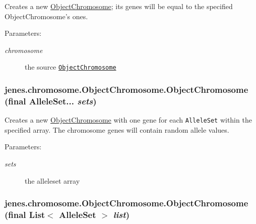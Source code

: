 Creates a new \hyperlink{classjenes_1_1chromosome_1_1_object_chromosome}{ObjectChromosome}; its genes will be equal to the specified ObjectChromosome's ones. 

\begin{Desc}
\item[Parameters:]
\begin{description}
\item[{\em chromosome}]the source {\tt \hyperlink{classjenes_1_1chromosome_1_1_object_chromosome}{ObjectChromosome}} \end{description}
\end{Desc}
\hypertarget{classjenes_1_1chromosome_1_1_object_chromosome_ba090ada4d0f24caaf6f68cfed7800f0}{
\subsubsection[ObjectChromosome]{\setlength{\rightskip}{0pt plus 5cm}jenes.chromosome.ObjectChromosome.ObjectChromosome (final AlleleSet... {\em sets})}}
\label{classjenes_1_1chromosome_1_1_object_chromosome_ba090ada4d0f24caaf6f68cfed7800f0}


Creates a new \hyperlink{classjenes_1_1chromosome_1_1_object_chromosome}{ObjectChromosome} with one gene for each {\tt AlleleSet} within the specified array. The chromosome genes will contain random allele values. 

\begin{Desc}
\item[Parameters:]
\begin{description}
\item[{\em sets}]the alleleset array \end{description}
\end{Desc}
\hypertarget{classjenes_1_1chromosome_1_1_object_chromosome_a6c8dcc77a9129f9634ea02f19d5a968}{
\subsubsection[ObjectChromosome]{\setlength{\rightskip}{0pt plus 5cm}jenes.chromosome.ObjectChromosome.ObjectChromosome (final List$<$ AlleleSet $>$ {\em list})}}
\label{classjenes_1_1chromosome_1_1_object_chromosome_a6c8dcc77a9129f9634ea02f19d5a968}


